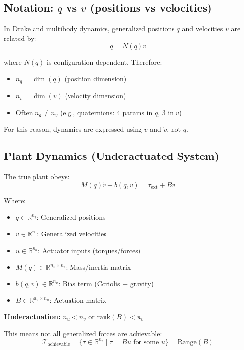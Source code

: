 \subsection*{Notation: $q$ vs $v$ (positions vs velocities)}

In Drake and multibody dynamics, generalized positions $q$ and velocities $v$ are related by:
\begin{equation}
\dot{q} = N(q) v
\tag{Kinematic Map}
\end{equation}

where $N(q)$ is configuration-dependent. Therefore:
\begin{itemize}
\item $n_q = \dim(q)$ (position dimension)
\item $n_v = \dim(v)$ (velocity dimension)
\item Often $n_q \neq n_v$ (e.g., quaternions: 4 params in $q$, 3 in $v$)
\end{itemize}

For this reason, dynamics are expressed using $v$ and $\dot{v}$, not $\ddot{q}$.

\subsection*{Plant Dynamics (Underactuated System)}

The true plant obeys:
\begin{equation}
M(q) \dot{v} + b(q,v) = \tau_{\text{ext}} + B u
\tag{Plant Dynamics}
\end{equation}

Where:
\begin{itemize}
\item $q \in \mathbb{R}^{n_q}$: Generalized positions
\item $v \in \mathbb{R}^{n_v}$: Generalized velocities
\item $u \in \mathbb{R}^{n_u}$: Actuator inputs (torques/forces)
\item $M(q) \in \mathbb{R}^{n_v \times n_v}$: Mass/inertia matrix
\item $b(q,v) \in \mathbb{R}^{n_v}$: Bias term (Coriolis + gravity)
\item $B \in \mathbb{R}^{n_v \times n_u}$: Actuation matrix
\end{itemize}

\textbf{Underactuation:} $n_u < n_v$ or $\text{rank}(B) < n_v$

This means not all generalized forces are achievable:
\begin{equation}
\mathcal{T}_{\text{achievable}} = \{\tau \in \mathbb{R}^{n_v} \mid \tau = Bu \text{ for some } u\} = \text{Range}(B)
\end{equation}


